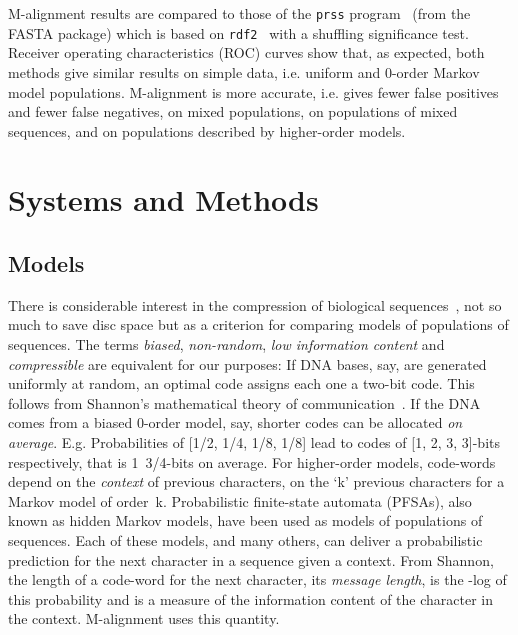 \documentclass[letterpaper,11pt,oneside]{article}
\begin{document}
\begin{multicols}{2}
M-alignment results are compared to those of
the {\tt prss} program~\cite{smith81} (from the FASTA package) which
is based on {\tt rdf2}~\cite{pearson88} with a shuffling significance test.
Receiver operating characteristics (ROC) curves show that, as expected,
both methods give similar results
on simple data, i.e. uniform and 0-order Markov model populations.
M-alignment is more accurate,
i.e. gives fewer false positives and fewer false negatives,
on mixed populations,
on populations of mixed sequences, and
on populations described by higher-order models.


\section{Systems and Methods} \label{sec:sys}

\subsection{Models} \label{sec:models}

There is considerable interest in the compression of biological
sequences~\cite{grumbach94,loewenstern96,rivals97,allison00},
not so much to save disc space but
as a criterion for comparing models of populations of sequences.
The terms {\em biased}, {\em non-random}, {\em low information content}
and {\em compressible} are equivalent for our purposes:
If DNA bases, say, are generated uniformly at random, an optimal code
assigns each one a two-bit code.
This follows from
Shannon's mathematical theory of communication~\cite{shannon49}.
If the DNA comes from a biased 0-order model, say,
shorter codes can be allocated {\em on average}.
E.g. Probabilities of [1/2, 1/4, 1/8, 1/8] lead to codes of
[1, 2, 3, 3]-bits respectively, that is 1~3/4-bits on average.
For higher-order models, code-words depend on the {\em context}
of previous characters, on the `k' previous characters
for a Markov model of order~k.
Probabilistic finite-state automata (PFSAs),
also known as hidden Markov models,
have been used as models \cite{georgeff84} of populations of sequences.
Each of these models, and many others, can deliver a probabilistic
prediction for the next character in a sequence given a context.
From Shannon, the length of a code-word for the next character,
its {\em message length}, is the -log of this probability and
is a measure of the information content of the character in the context.
M-alignment uses this quantity.



\end{multicols}
\end{document}
